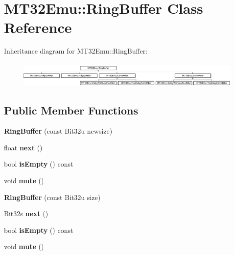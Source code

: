 \hypertarget{classMT32Emu_1_1RingBuffer}{\section{M\-T32\-Emu\-:\-:Ring\-Buffer Class Reference}
\label{classMT32Emu_1_1RingBuffer}
}
Inheritance diagram for M\-T32\-Emu\-:\-:Ring\-Buffer\-:\begin{figure}[H]
\begin{center}
\leavevmode
\includegraphics[height=1.284404cm]{classMT32Emu_1_1RingBuffer}
\end{center}
\end{figure}
\subsection*{Public Member Functions}
\begin{DoxyCompactItemize}
\item 
\hypertarget{classMT32Emu_1_1RingBuffer_ac94a5d50e7128073c9248a41c96172bc}{{\bfseries Ring\-Buffer} (const Bit32u newsize)}\label{classMT32Emu_1_1RingBuffer_ac94a5d50e7128073c9248a41c96172bc}

\item 
\hypertarget{classMT32Emu_1_1RingBuffer_aea169845998bbea598fd1c67f9fe0841}{float {\bfseries next} ()}\label{classMT32Emu_1_1RingBuffer_aea169845998bbea598fd1c67f9fe0841}

\item 
\hypertarget{classMT32Emu_1_1RingBuffer_a33f099538049316cf9ce3a95f14d7139}{bool {\bfseries is\-Empty} () const }\label{classMT32Emu_1_1RingBuffer_a33f099538049316cf9ce3a95f14d7139}

\item 
\hypertarget{classMT32Emu_1_1RingBuffer_a4ce06b7b7de09e48fc1a4f73a01c7763}{void {\bfseries mute} ()}\label{classMT32Emu_1_1RingBuffer_a4ce06b7b7de09e48fc1a4f73a01c7763}

\item 
\hypertarget{classMT32Emu_1_1RingBuffer_a107170c1ec49b44412b997159e54db23}{{\bfseries Ring\-Buffer} (const Bit32u size)}\label{classMT32Emu_1_1RingBuffer_a107170c1ec49b44412b997159e54db23}

\item 
\hypertarget{classMT32Emu_1_1RingBuffer_a91048eb3e56ce9c9c39787f56dfe8e66}{Bit32s {\bfseries next} ()}\label{classMT32Emu_1_1RingBuffer_a91048eb3e56ce9c9c39787f56dfe8e66}

\item 
\hypertarget{classMT32Emu_1_1RingBuffer_a3824f928f4733052daeb441ab079adb1}{bool {\bfseries is\-Empty} () const }\label{classMT32Emu_1_1RingBuffer_a3824f928f4733052daeb441ab079adb1}

\item 
\hypertarget{classMT32Emu_1_1RingBuffer_aacc45a48c069545f473967ea39a8e862}{void {\bfseries mute} ()}\label{classMT32Emu_1_1RingBuffer_aacc45a48c069545f473967ea39a8e862}

\end{DoxyCompactItemize}
